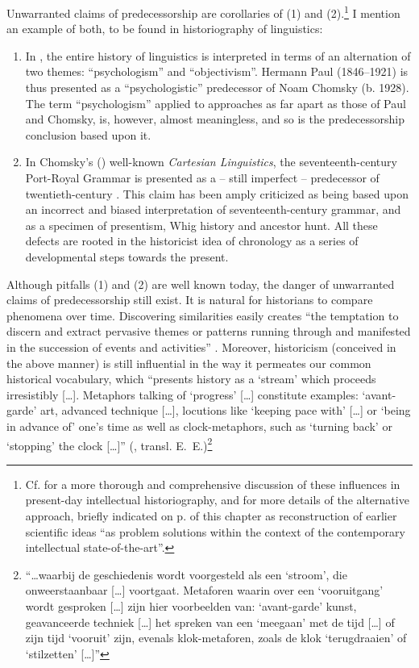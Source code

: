 \documentclass[output=paper]{langscibook}
\begin{document}
Unwarranted claims of predecessorship are corollaries of (1) and (2).\footnote{Cf. \citet[chaps. 2 \& 3]{Elffers1991} for a more thorough and comprehensive discussion of these influences in present-day intellectual historiography, and for more details of the alternative approach, briefly indicated on p. \pageref{q:elffers:probsols} of this chapter as reconstruction of earlier scientific ideas ``as problem solutions within the context of the contemporary intellectual state-of-the-art''.} I mention an example of both, to be found in historiography of linguistics:

\begin{enumerate}

\item[Ad 1.] In \citet{Antal1984}, the entire history of linguistics is interpreted in terms of an alternation of  two themes: ``psychologism'' and ``objectivism''. Hermann Paul (1846--1921) is thus presented as a ``psychologistic'' predecessor of Noam Chomsky (b. 1928). The term ``psychologism'' applied to approaches as far apart as those of Paul and Chomsky, is, however, almost meaningless, and so is the predecessorship conclusion based upon it.

\item[Ad 2.] In Chomsky’s (\citeyear{Chomsky20091966}) well-known \emph{Cartesian Linguistics}, the seven\-teenth-century Port-Royal Grammar is presented as a -- still imperfect -- predecessor of twentieth-century . This claim has been amply criticized as being based upon an incorrect and biased interpretation of seven\-teenth-century grammar, and as a specimen of presentism, Whig history and ancestor hunt. All these defects are rooted in the historicist idea of chronology as a series of developmental steps towards the present. 

\end{enumerate}

Although pitfalls (1) and (2) are well known today, the danger of unwarranted claims of predecessorship still exist. It is natural for historians to compare phenomena over time. Discovering similarities easily creates ``the temptation to discern and extract pervasive themes or patterns running through and manifested in the succession of events and activities'' \citep[7--8]{Robins1997}. Moreover, historicism (conceived in the above manner) is still influential in the way it permeates our common historical vocabulary, which ``presents history as a `stream' which proceeds irresistibly […]. Metaphors talking of `progress' […] constitute examples: `avant-garde' art, advanced technique […], locutions like `keeping pace with' […] or `being in advance of' one's time as well as clock-metaphors, such as `turning back' or `stopping' the clock […]'' (\citealt[131]{Dussen1986}, transl. E.~E.)\footnote{``…waarbij de geschiedenis wordt voorgesteld als een `stroom', die onweerstaanbaar […] voortgaat. Metaforen waarin over een `vooruitgang' wordt gesproken […] zijn hier voorbeelden van: `avant-garde' kunst, geavanceerde techniek […] het spreken van een `meegaan' met de tijd […] of zijn tijd `vooruit' zijn, evenals klok-metaforen, zoals de klok `terugdraaien' of `stilzetten' […]''}
\end{document}
